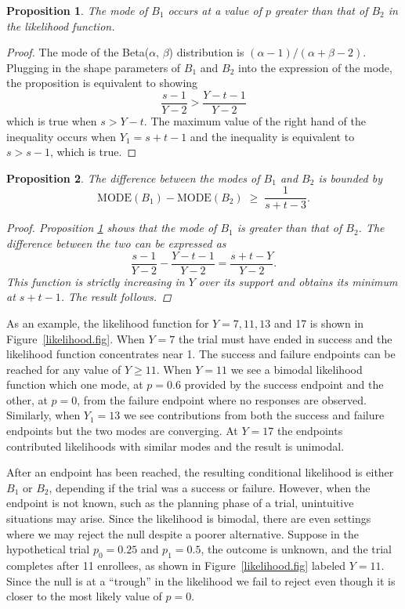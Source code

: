 \documentclass[sii]{ipart}
\newtheorem{prop}{Proposition}
\begin{document}
\begin{prop} \label{mode_order}
The mode of $B_1$ occurs at a value of $p$ greater than that of $B_2$ in the likelihood function. 
\end{prop}
\begin{proof}
The mode of the Beta($\alpha,\, \beta$) distribution is $(\alpha-1) / (\alpha+\beta-2)$. Plugging in the shape parameters of $B_1$ and $B_2$ into the expression of the mode, the proposition is equivalent to showing
\begin{equation*}
\frac{s-1}{Y - 2} > \frac{Y - t- 1}{Y -2 }
\end{equation*}
which is true when $s > Y - t$. The maximum value of the right hand of the inequality occurs when $Y_1 = s+t-1$ and the inequality is equivalent to $s > s-1$, which is true.
\end{proof}
\begin{prop}
The difference between the modes of $B_1$ and $B_2$ is bounded by
\begin{equation*}
\textrm{MODE}(B_1) - \textrm{MODE}(B_2) 
\; \geq \; \frac{1}{s+t-3}.
\end{equation*}
\begin{proof}
Proposition \ref{mode_order} shows that the mode of $B_1$ is greater than that of $B_2$. The difference
between the two can be expressed as
\begin{equation*}
\frac{s-1}{Y-2} - \frac{Y-t-1}{Y-2} = \frac{s+t-Y}{Y-2}.
\end{equation*}
This function is strictly increasing in $Y$ over its support and obtains its minimum at $s+t-1$. The result follows.
\end{proof}
\end{prop}

As an example, the likelihood function for $Y = 7, 11, 13$ and 17 is shown in
Figure~\ref{likelihood.fig}. When $Y = 7$ the trial must have ended in success and the likelihood function concentrates near 1. The success and
failure endpoints can be reached for any value of $Y \geq 11$. When 
$Y = 11$ we see a bimodal likelihood function which one mode, at $p=0.6$
provided by the success endpoint and the other, at $p=0$, from the
failure endpoint where no responses are observed. Similarly, when $Y_1=13$
we see contributions from both the success and failure endpoints but
the two modes are converging. At $Y=17$ the endpoints contributed likelihoods with similar modes and the result is unimodal.

After an endpoint has been reached, the resulting conditional likelihood is either $B_1$ or $B_2$, depending if the trial was a success or failure. However, when the endpoint is not known, such as the planning phase of a trial, unintuitive situations may arise. Since the likelihood is bimodal, there are even settings where we may reject the null despite a poorer alternative. Suppose in the hypothetical trial $p_0=0.25$ and $p_1=0.5$, the outcome is unknown, and the trial completes after 11 enrollees, as shown in Figure~\ref{likelihood.fig} labeled $Y=11$. Since the null is at a ``trough'' in the likelihood we fail to reject even though it is closer to the most likely value of $p=0$. 
\end{document}
